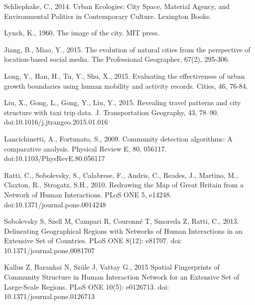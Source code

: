 \documentclass[10pt,letterpaper]{article}
\begin{document}
%
%
% 
\begin{thebibliography}{10}
Schliephake, C., 2014. Urban Ecologies: City Space, Material Agency, and Environmental Politics in Contemporary Culture. Lexington Books.

Lynch, K., 1960. The image of the city. MIT press.

Jiang, B., Miao, Y., 2015. The evolution of natural cities from the perspective of location-based social media. The Professional Geographer, 67(2), 295-306.

Long, Y., Han, H., Tu, Y., Shu, X., 2015. Evaluating the effectiveness of urban growth boundaries using human mobility and activity records. Cities, 46, 76-84.

Liu, X., Gong, L., Gong, Y., Liu, Y., 2015. Revealing travel patterns and city structure with taxi trip data. J. Transportation Geography, 43, 78–90. doi:10.1016/j.jtrangeo.2015.01.016

Lancichinetti, A., Fortunato, S., 2009. Community detection algorithms: A comparative analysis. Physical Review E, 80, 056117. doi:10.1103/PhysRevE.80.056117

Ratti, C., Sobolevsky, S., Calabrese, F., Andris, C., Reades, J., Martino, M., Claxton, R., Strogatz, S.H., 2010. Redrawing the Map of Great Britain from a Network of Human Interactions. PLoS ONE 5, e14248. doi:10.1371/journal.pone.0014248

Sobolevsky S, Szell M, Campari R, Couronné T, Smoreda Z, Ratti, C., 2013. Delineating Geographical Regions with Networks of Human Interactions in an Extensive Set of Countries. PLoS ONE 8(12): e81707. doi: 10.1371/journal.pone.0081707

Kallus Z, Barankai N, Szüle J, Vattay G., 2015 Spatial Fingerprints of Community Structure in Human Interaction Network for an Extensive Set of Large-Scale Regions. PLoS ONE 10(5): e0126713. doi: 10.1371/journal.pone.0126713 


\end{thebibliography}
\end{document}
